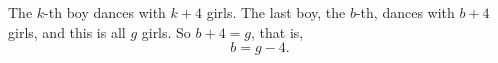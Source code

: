 The $k$-th boy dances with $k+4$ girls. The last boy, the $b$-th, dances with $b+4$ girls, and this is all $g$ girls. So $b+4=g$, that is,
\[
\boxed{b=g-4}.
\]
